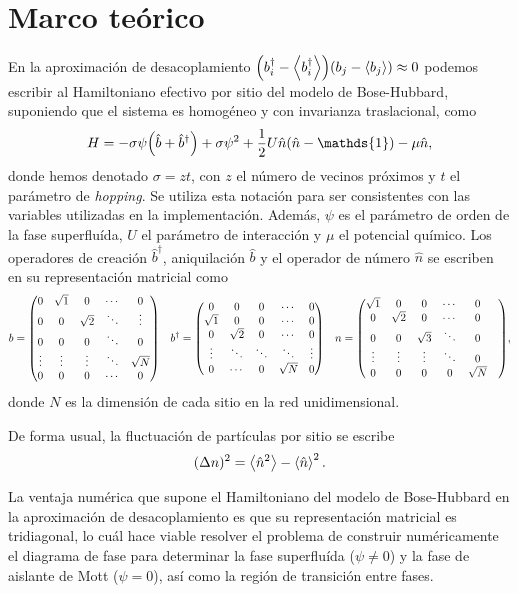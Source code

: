 \documentclass[11pt,letterpaper]{article}
\newcommand{\id}{\mathds{1}}
\begin{document}
\section{Marco teórico}
En la aproximación de desacoplamiento 
$\qty(b_i^{\dagger}-\expval{b_i^{\dagger}})\qty(b_j-\expval{b_j})\approx 0$
podemos escribir al Hamiltoniano efectivo por sitio del modelo de Bose-Hubbard, suponiendo 
que el sistema es homogéneo y con invarianza traslacional, como
\begin{align}\label{eq:BH:Hamiltonian}
H=-\sigma \psi \qty(\hat b+\hat b^{\dagger})+\sigma \psi^2+
\frac{1}{2}U\hat n\qty(\hat n-\id)-\mu \hat n,
\end{align}
donde hemos denotado $\sigma=zt$, con $z$ el número de vecinos próximos y 
$t$ el parámetro de \textit{hopping}. Se utiliza esta notación para ser 
consistentes con las variables utilizadas en la implementación.
Además, $\psi$ es el parámetro de orden de la fase superfluída,
$U$ el parámetro de interacción y $\mu$ el potencial químico. Los
operadores de creación $\hat b^{\dagger}$, aniquilación $\hat b$ 
y el operador de número $\hat n$ se escriben en su representación matricial 
como
\begin{align}
b&=\mqty(0&\sqrt{1}&0&\cdots&0\\
0&0&\sqrt{2}&\ddots&\vdots\\
0&0&0&\ddots&0\\
\vdots&\vdots&\vdots&\ddots&\sqrt{N}\\
0&0&0&\cdots&0) &
b^{\dagger}&=\mqty(
0&0&0&\cdots&0\\
\sqrt{1}&0&0&\cdots&0\\
0&\sqrt{2}&0&\cdots&0\\
\vdots&\ddots&\ddots&\ddots&\vdots\\
0&\cdots&0&\sqrt{N}&0) &
n=\mqty(
\sqrt{1}&0&0&\cdots&0\\
0&\sqrt{2}&0&\cdots&0\\
0&0&\sqrt{3}&\ddots&0\\
\vdots&\vdots&\vdots&\ddots&0&\\
0&0&0&0&\sqrt{N}
), 
\end{align}
donde $N$ es la dimensión de cada sitio en la red unidimensional.

De forma usual, la fluctuación de partículas por sitio se escribe
\begin{align}
(\Delta n)^2=\expval{\hat n^2}-\expval{\hat n}^2.
\end{align}

La ventaja numérica que supone el Hamiltoniano del modelo de Bose-Hubbard
en la aproximación de desacoplamiento es que su representación matricial 
es tridiagonal, lo cuál hace viable resolver el problema de construir 
numéricamente el diagrama de fase para determinar la fase superfluída
($\psi\neq 0$) y la fase de aislante de Mott ($\psi=0$), así como la región
de transición entre fases.
\end{document}
